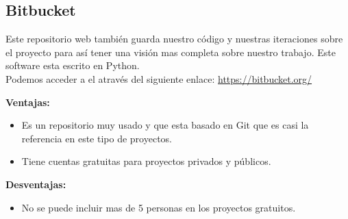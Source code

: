 \subsection{Bitbucket}
Este repositorio web también guarda nuestro código y nuestras iteraciones sobre el proyecto para así tener una visión mas completa sobre nuestro trabajo.
Este software esta escrito en Python.\\
Podemos acceder a el através del siguiente enlace: 
\url{https://bitbucket.org/}


\textbf{Ventajas:}
\begin{itemize}

\item Es un repositorio muy usado y que esta basado en Git que es casi la referencia en este tipo de proyectos.

\item Tiene cuentas gratuitas para proyectos privados y públicos.

\end{itemize}

\textbf{Desventajas:}

\begin{itemize}
\item No se puede incluir mas de 5 personas en los proyectos gratuitos.
\end{itemize}





 